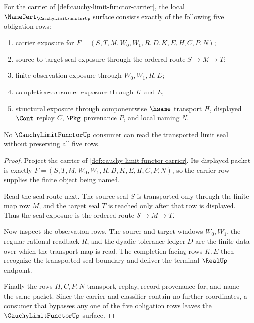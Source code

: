 \begin{theorem}
\label{thm:cauchy-limit-functor-namecert-obligations}
For the carrier of \autoref{def:cauchy-limit-functor-carrier}, the local $\NameCert_{\CauchyLimitFunctorUp}$ surface consists exactly of the following five obligation rows:
\begin{enumerate}
\item carrier exposure for $F=(S,T,M,W_0,W_1,R,D,K,E,H,C,P,N)$;
\item source-to-target seal exposure through the ordered route $S \to M \to T$;
\item finite observation exposure through $W_0,W_1,R,D$;
\item completion-consumer exposure through $K$ and $E$;
\item structural exposure through componentwise $\hsame$ transport $H$, displayed $\Cont$ replay $C$, $\Pkg$ provenance $P$, and local naming $N$.
\end{enumerate}
No $\CauchyLimitFunctorUp$ consumer can read the transported limit seal without preserving all five rows.
\end{theorem}
\begin{proof}
Project the carrier of \autoref{def:cauchy-limit-functor-carrier}. Its displayed packet is exactly $F=(S,T,M,W_0,W_1,R,D,K,E,H,C,P,N)$, so the carrier row supplies the finite object being named.

Read the seal route next. The source seal $S$ is transported only through the finite map row $M$, and the target seal $T$ is reached only after that row is displayed. Thus the seal exposure is the ordered route $S \to M \to T$.

Now inspect the observation rows. The source and target windows $W_0,W_1$, the regular-rational readback $R$, and the dyadic tolerance ledger $D$ are the finite data over which the transport map is read. The completion-facing rows $K,E$ then recognize the transported seal boundary and deliver the terminal $\RealUp$ endpoint.

Finally the rows $H,C,P,N$ transport, replay, record provenance for, and name the same packet. Since the carrier and classifier contain no further coordinates, a consumer that bypasses any one of the five obligation rows leaves the $\CauchyLimitFunctorUp$ surface.
\end{proof}


